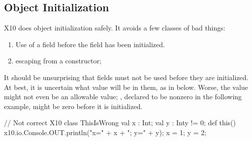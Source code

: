 \subsection{Object Initialization}


X10 does object initialization safely.  It avoids a few classes of bad things:
\begin{enumerate}
\item Use of a field before the field has been initialized.
\item {} escaping from a constructor;
\end{enumerate}

It should be unsurprising that fields must not be used before they are
initialized. At best, it is uncertain what value will be in them, as in
 below. Worse, the value might not even be an allowable value; ,
declared to be nonzero in the following example, might be zero before it is
initialized.
\begin{xten}
// Not correct X10
class ThisIsWrong {
  val x : Int;
  val y : Int{y != 0};
  def this() {
    x10.io.Console.OUT.println("x=" + x + "; y=" + y);
    x = 1; y = 2;
  }
}
\end{xten}

